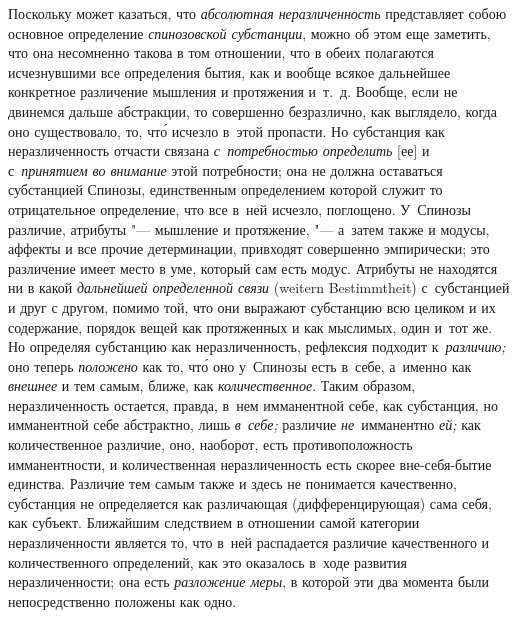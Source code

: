 Поскольку может казаться, что {\em абсолютная неразличенность} представляет
собою основное определение {\em спинозовской субстанции}, можно об этом еще
заметить, что она несомненно такова в том отношении, что в обеих полагаются
исчезнувшими все определения бытия, как и вообще всякое дальнейшее конкретное
различение мышления и протяжения и~т.~д. Вообще, если не двинемся дальше
абстракции, то совершенно безразлично, как выглядело, когда оно существовало,
то, чт\'{о} исчезло в~этой пропасти. Но субстанция как неразличенность отчасти
связана {\em с~потребностью определить} [ее] и с~{\em принятием во внимание}
этой потребности; она не должна оставаться субстанцией Спинозы, единственным
определением которой служит то отрицательное определение, что все в~ней
исчезло, поглощено. У~Спинозы
различие, атрибуты "--- мышление и протяжение, "--- а~затем также и модусы,
аффекты и все прочие детерминации, привходят совершенно эмпирически; это
различение имеет место в уме, который сам есть модус. Атрибуты не находятся ни
в какой {\em дальнейшей определенной связи} (wei\-tern Be\-stimmt\-heit)
с~субстанцией и друг с другом, помимо той, что они выражают субстанцию всю
целиком и их содержание, порядок вещей как протяженных и как мыслимых, один
и~тот же. Но определяя субстанцию как неразличенность, рефлексия подходит
к~{\em различию;} оно теперь {\em положено} как то, чт\'{о} оно у~Спинозы есть
в~себе, а~именно как {\em внешнее} и тем самым, ближе, как
{\em количественное}. Таким образом, неразличенность остается, правда, в~нем
имманентной себе, как субстанция, но имманентной себе абстрактно, лишь
{\em в~себе;} различие {\em не}~имманентно {\em ей;} как количественное
различие, оно, наоборот, есть противоположность имманентности, и количественная
неразличенность есть скорее вне-себя-бытие единства. Различие тем самым также и
здесь не понимается качественно, субстанция не определяется как различающая
(дифференцирующая) сама себя, как субъект. Ближайшим следствием в отношении
самой категории неразличенности является то, что в~ней распадается различие
качественного и количественного определений, как это оказалось в~ходе развития
неразличенности; она есть {\em разложение меры}, в которой эти два момента были
непосредственно положены как одно.

